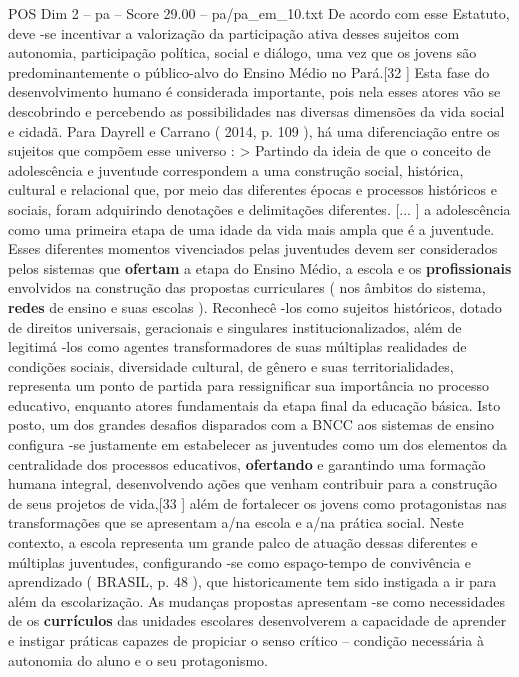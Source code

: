 \begin{textsample}{POS Dim 2 – pa – Score 29.00 – pa/pa\_em\_10.txt}
De acordo com esse Estatuto, deve -se incentivar a valorização da participação ativa desses sujeitos com autonomia, participação política, social e diálogo, uma vez que os jovens são predominantemente o público-alvo do Ensino Médio no Pará.[32 ] Esta fase do desenvolvimento humano é considerada importante, pois nela esses atores vão se descobrindo e percebendo as possibilidades nas diversas dimensões da vida social e cidadã.
Para Dayrell e Carrano ( 2014, p. 109 ), há uma diferenciação entre os sujeitos que compõem esse universo : > Partindo da ideia de que o conceito de adolescência e juventude correspondem a uma construção social, histórica, cultural e relacional que, por meio das diferentes épocas e processos históricos e sociais, foram adquirindo denotações e delimitações diferentes. [... ] a adolescência como uma primeira etapa de uma idade da vida mais ampla que é a juventude.
Esses diferentes momentos vivenciados pelas juventudes devem ser considerados pelos sistemas que \textbf{ofertam} a etapa do Ensino Médio, a escola e os \textbf{profissionais} envolvidos na construção das propostas curriculares ( nos âmbitos do sistema, \textbf{redes} de ensino e suas escolas ).
Reconhecê -los como sujeitos históricos, dotado de direitos universais, geracionais e singulares institucionalizados, além de legitimá -los como agentes transformadores de suas múltiplas realidades de condições sociais, diversidade cultural, de gênero e suas territorialidades, representa um ponto de partida para ressignificar sua importância no processo educativo, enquanto atores fundamentais da etapa final da educação básica.
Isto posto, um dos grandes desafios disparados com a BNCC aos sistemas de ensino configura -se justamente em estabelecer as juventudes como um dos elementos da centralidade dos processos educativos, \textbf{ofertando} e garantindo uma formação humana integral, desenvolvendo ações que venham contribuir para a construção de seus projetos de vida,[33 ] além de fortalecer os jovens como protagonistas nas transformações que se apresentam a/na escola e a/na prática social.
Neste contexto, a escola representa um grande palco de atuação dessas diferentes e múltiplas juventudes, configurando -se como espaço-tempo de convivência e aprendizado ( BRASIL, p. 48 ), que historicamente tem sido instigada a ir para além da escolarização.
As mudanças propostas apresentam -se como necessidades de os \textbf{currículos} das unidades escolares desenvolverem a capacidade de aprender e instigar práticas capazes de propiciar o senso crítico – condição necessária à autonomia do aluno e o seu protagonismo.

\end{textsample}

